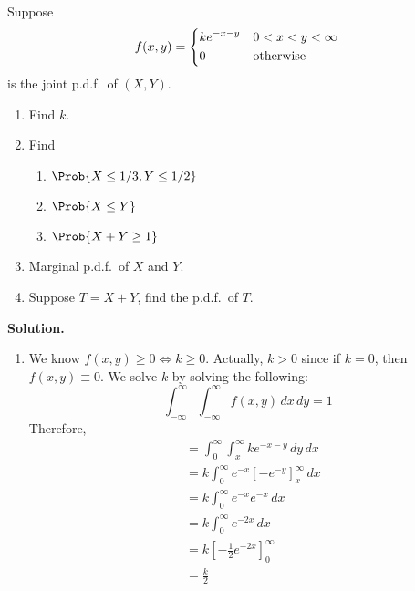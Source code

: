 \begin{Example}{}{}
    Suppose
    \[ f(x,y)=\begin{dcases}
            ke^{-x-y} & 0<x<y<\infty     \\
            0         & \text{otherwise}
        \end{dcases} \]
    is the joint p.d.f.\ of $ (X,Y) $.
    \begin{enumerate}[label=(\roman*)]
        \item Find $ k $.
        \item Find
              \begin{enumerate}[label=(\alph*)]
                  \item $ \Prob{X\le 1/3,Y\le 1/2} $
                  \item $ \Prob{X\le Y} $
                  \item $ \Prob{X+Y\ge 1} $
              \end{enumerate}
        \item Marginal p.d.f.\ of $ X $ and $ Y $.
        \item Suppose $ T=X+Y $, find the p.d.f.\ of $ T $.
    \end{enumerate}
    \textbf{Solution.}
    \begin{enumerate}[label=(\roman*)]
        \item We know $ f(x,y)\ge 0\iff k\ge 0 $. Actually,
              $ k>0 $ since if $ k=0 $, then $ f(x,y)\equiv 0 $.
              We solve $ k $ by solving the following:
              \[ \int_{-\infty}^{\infty} \int_{-\infty}^{\infty} f(x,y)\, d{x} \, d{y} =1 \]
              Therefore,
              \begin{align*}
                   & =\int_{0}^{\infty} \int_{x}^{\infty} ke^{-x-y}\, d{y} \, d{x}     \\
                   & =k \int_{0}^{\infty} e^{-x}\left[ -e^{-y} \right]_x^\infty\, d{x} \\
                   & =k \int_{0}^{\infty} e^{-x}e^{-x}\, d{x}                          \\
                   & =k \int_{0}^{\infty} e^{-2x}\, d{x}                               \\
                   & =k\left[ -\frac{1}{2} e^{-2x} \right]_0^\infty                    \\
                   & =\frac{k}{2}
              \end{align*}


\end{enumerate}
\end{Example}
